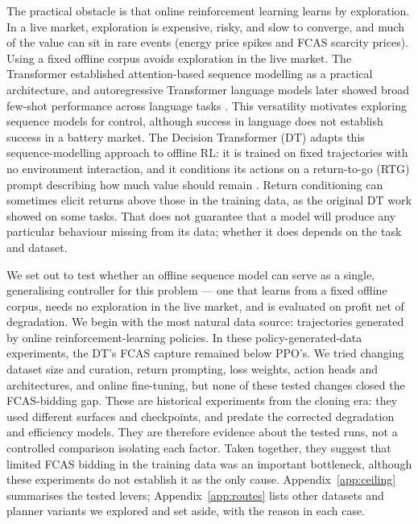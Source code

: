 \documentclass{article}
\begin{document}
The practical obstacle is that online reinforcement learning learns by
exploration. In a live market, exploration is expensive, risky, and slow to
converge, and much of the value can sit in rare events (energy price spikes
and FCAS scarcity prices). Using a fixed offline corpus avoids exploration in
the live market. The Transformer established attention-based sequence modelling
as a practical architecture, and autoregressive Transformer language models
later showed broad few-shot performance across language tasks
\citep{vaswani2017attention,brown2020fewshot}. This versatility motivates
exploring sequence models for control, although success in language does not
establish success in a battery market. The Decision Transformer (DT)
adapts this sequence-modelling approach to offline RL: it is trained on fixed
trajectories with no environment interaction, and it conditions its actions on a
return-to-go (RTG) prompt describing how much value should remain
\citep{chen2021decision}. Return conditioning can sometimes elicit returns
above those in the training data, as the original DT work showed on some tasks.
That does not guarantee that a model will produce any particular behaviour
missing from its data; whether it does depends on the task and dataset.

We set out to test whether an offline sequence model can serve as a single,
generalising controller for this problem --- one that learns from a fixed
offline corpus, needs no exploration in the live market, and is evaluated on
profit net of degradation. We begin
with the most natural data source: trajectories generated by online
reinforcement-learning policies. In these policy-generated-data experiments,
the DT's FCAS capture remained below PPO's. We tried changing dataset size and
curation, return prompting, loss weights, action heads and architectures, and
online fine-tuning, but none of these tested changes closed the FCAS-bidding
gap. These are historical experiments from the cloning era: they used different
surfaces and checkpoints, and predate the corrected degradation and efficiency
models. They are therefore evidence about the tested runs, not a controlled
comparison isolating each factor. Taken together, they suggest that limited
FCAS bidding in the training data was an important bottleneck, although these
experiments do not establish it as the only cause. Appendix~\ref{app:ceiling}
summarises the tested levers; Appendix~\ref{app:routes} lists other datasets
and planner variants we explored and set aside, with the reason in each case.
\end{document}
